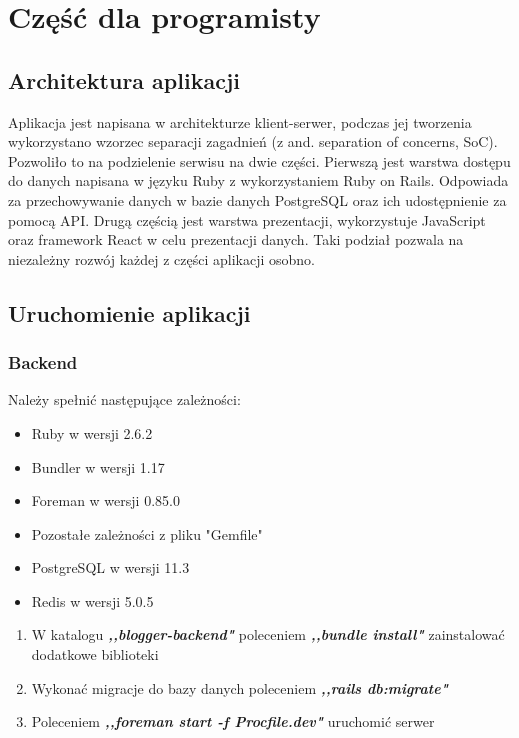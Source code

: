 \documentclass[declaration,shortabstract]{iithesis}
\begin{document}
\chapter{Część dla programisty}
\section{Architektura aplikacji}
Aplikacja jest napisana w architekturze klient-serwer, podczas jej tworzenia wykorzystano wzorzec separacji  zagadnień (z and. separation of concerns, SoC). Pozwoliło to na podzielenie serwisu na dwie części. Pierwszą jest warstwa dostępu do danych napisana w języku Ruby z wykorzystaniem Ruby on Rails. Odpowiada za przechowywanie danych w bazie danych PostgreSQL oraz ich udostępnienie za pomocą API. Drugą częścią jest warstwa prezentacji, wykorzystuje JavaScript oraz framework React w celu prezentacji danych. Taki podział pozwala na niezależny rozwój każdej z części aplikacji osobno.

\section{Uruchomienie aplikacji}

\subsection{Backend}
Należy spełnić następujące zależności:
        \begin{itemize}
            \item Ruby w wersji 2.6.2
            \item Bundler w wersji 1.17
            \item Foreman w wersji 0.85.0
            \item Pozostałe zależności z pliku "Gemfile"
            \item PostgreSQL w wersji 11.3
            \item Redis w wersji 5.0.5
        \end{itemize}

\begin{enumerate}
    \item W katalogu \textbf{\textit{,,blogger-backend"}} poleceniem \textbf{\textit{,,bundle install"}} zainstalować dodatkowe biblioteki
    \item Wykonać migracje do bazy danych poleceniem \textbf{\textit{,,rails db:migrate"}}
    \item Poleceniem \textbf{\textit{,,foreman start -f Procfile.dev"}} uruchomić serwer
\end{enumerate}
\end{document}
